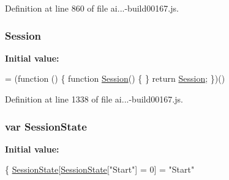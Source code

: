 Definition at line 860 of file ai...-\/build00167.\+js.

\subsubsection[{\texorpdfstring{Session}{Session}}]{ Session}\hypertarget{_scripts_2ai_80_822_89-build00167_8js_adde58525426df76d5d4edaa9c8090a38}{}\label{_scripts_2ai_80_822_89-build00167_8js_adde58525426df76d5d4edaa9c8090a38}
{\bfseries Initial value\+:}
\begin{DoxyCode}
= (\textcolor{keyword}{function} () \{
                \textcolor{keyword}{function} \hyperlink{obj_2_release_2_package_2_package_tmp_2_scripts_2ai_80_822_89-build00167_8js_adde58525426df76d5d4edaa9c8090a38}{Session}() \{
                \}
                \textcolor{keywordflow}{return} \hyperlink{obj_2_release_2_package_2_package_tmp_2_scripts_2ai_80_822_89-build00167_8js_adde58525426df76d5d4edaa9c8090a38}{Session};
            \})()
\end{DoxyCode}


Definition at line 1338 of file ai...-\/build00167.\+js.

\subsubsection[{\texorpdfstring{Session\+State}{SessionState}}]{\setlength{\rightskip}{0pt plus 5cm}var Session\+State}\hypertarget{_scripts_2ai_80_822_89-build00167_8js_aed1bddab8f824e41b716e38a2998ff37}{}\label{_scripts_2ai_80_822_89-build00167_8js_aed1bddab8f824e41b716e38a2998ff37}
{\bfseries Initial value\+:}
\begin{DoxyCode}
\{
        \hyperlink{obj_2_release_2_package_2_package_tmp_2_scripts_2ai_80_822_89-build00167_8js_aed1bddab8f824e41b716e38a2998ff37}{SessionState}[\hyperlink{obj_2_release_2_package_2_package_tmp_2_scripts_2ai_80_822_89-build00167_8js_aed1bddab8f824e41b716e38a2998ff37}{SessionState}[\textcolor{stringliteral}{"Start"}] = 0] = \textcolor{stringliteral}{"Start"}
\end{DoxyCode}


